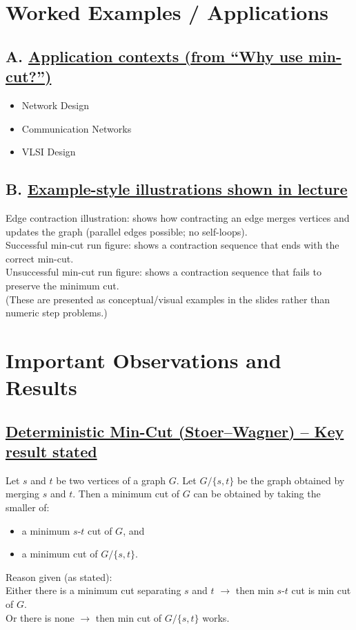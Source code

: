 \documentclass[11pt]{article}
\begin{document}
\vspace{1cm}
\section{Worked Examples / Applications}

\subsection*{A. \underline{Application contexts (from ``Why use min-cut?'')}}
\begin{itemize}
\item Network Design
\item Communication Networks
\item VLSI Design
\end{itemize}

\subsection*{B. \underline{Example-style illustrations shown in lecture}}
Edge contraction illustration: shows how contracting an edge merges vertices and updates the graph (parallel edges possible; no self-loops).\\
Successful min-cut run figure: shows a contraction sequence that ends with the correct min-cut.\\
Unsuccessful min-cut run figure: shows a contraction sequence that fails to preserve the minimum cut.\\
(These are presented as conceptual/visual examples in the slides rather than numeric step problems.)

\vspace{1cm}
\section{Important Observations and Results}

\subsection*{\underline{Deterministic Min-Cut (Stoer--Wagner) -- Key result stated}}
Let $s$ and $t$ be two vertices of a graph $G$. Let $G/\{s,t\}$ be the graph obtained by merging $s$ and $t$. Then a minimum cut of $G$ can be obtained by taking the smaller of:
\begin{itemize}
\item a minimum $s$-$t$ cut of $G$, and
\item a minimum cut of $G/\{s,t\}$.
\end{itemize}
Reason given (as stated):\\
Either there is a minimum cut separating $s$ and $t$ $\rightarrow$ then min $s$-$t$ cut is min cut of $G$.\\
Or there is none $\rightarrow$ then min cut of $G/\{s,t\}$ works.
\end{document}
